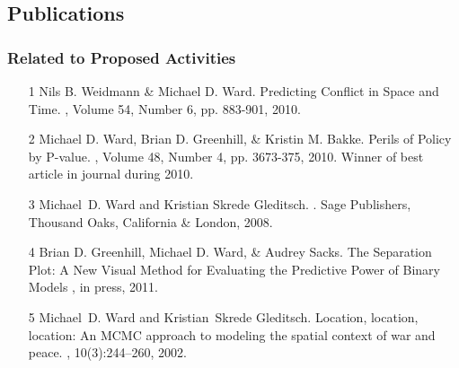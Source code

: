 \documentclass[pdftex,12pt,fullpage,oneside]{amsart}
\begin{document}
\subsection*{Publications}
\subsubsection*{Related to Proposed Activities}
\begin{itemize}
\item[1] Nils B. Weidmann \& Michael D. Ward. 
\newblock Predicting Conflict in Space and Time.
, Volume 54,
Number 6, pp. 883-901, 2010. 

\item[2] Michael D. Ward, Brian D. Greenhill, \& Kristin M. Bakke.
\newblock Perils of Policy by P-value.
, Volume 48, Number 4, pp. 
3673-375, 2010. Winner of best article in journal during 2010.

\item[3]Michael~D. Ward and Kristian Skrede Gleditsch.
.
\newblock Sage Publishers, Thousand Oaks, California \& London, 2008. %

\item[4] Brian D. Greenhill, Michael D. Ward, \& Audrey Sacks.
\newblock The Separation Plot: A New Visual Method for Evaluating the Predictive Power of Binary Models
, in press, 2011.

\item[5]
Michael~D. Ward and Kristian~Skrede Gleditsch.
\newblock Location, location, location: An MCMC approach to modeling the
  spatial context of war and peace.
, 10(3):244--260, 2002.
\end{itemize}
\end{document}
